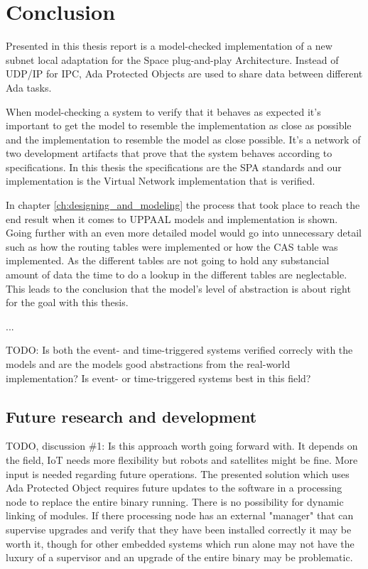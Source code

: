 \chapter{Conclusion}\label{ch:conclusion}
Presented in this thesis report is a model-checked implementation of a new
subnet local adaptation for the Space plug-and-play Architecture. Instead of
UDP/IP for IPC, Ada Protected Objects are used to share data between different
Ada tasks.

When model-checking a system to verify that it behaves as expected it's
important to get the model to resemble the implementation as close as possible
and the implementation to resemble the model as close possible. It's a network
of two development artifacts that prove that the system behaves according to
specifications. In this thesis the specifications are the SPA standards
and our implementation is the Virtual Network implementation that is verified.

In chapter \ref{ch:designing_and_modeling} the process that took place to reach
the end result when it comes to UPPAAL models and implementation is shown.
Going further with an even more detailed model would go into unnecessary detail
such as how the routing tables were implemented or how the CAS table was
implemented. As the different tables are not going to hold any substancial
amount of data the time to do a lookup in the different tables are
neglectable. This leads to the conclusion that the model's level of abstraction
is about right for the goal with this thesis.

...

TODO: Is both the event- and time-triggered systems verified correcly with the
models and are the models good abstractions from the real-world implementation?
Is event- or time-triggered systems best in this field?

\section{Future research and development}
TODO, discussion \#1: Is this approach worth going forward with. It depends on
the field, IoT needs more flexibility but robots and satellites might be fine.
More input is needed regarding future operations. The presented solution which
uses Ada Protected Object requires future updates to the software in a
processing node to replace the entire binary running. There is no possibility
for dynamic linking of modules.  If there processing node has an external
"manager" that can supervise upgrades and verify that they have been installed
correctly it may be worth it, though for other embedded systems which run alone
may not have the luxury of a supervisor and an upgrade of the entire binary may
be problematic.

